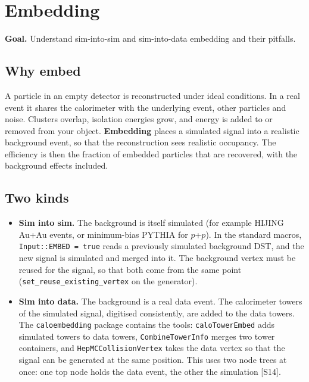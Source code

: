 \documentclass[11pt,letterpaper]{article}
\newcommand{\goal}[1]{\par\noindent\textbf{Goal.} #1\par}
\begin{document}
\section{Embedding}\label{sec:embed}
\goal{Understand sim-into-sim and sim-into-data embedding and their pitfalls.}

\subsection{Why embed}
A particle in an empty detector is reconstructed under ideal conditions. In a real event it shares the calorimeter with the underlying event, other particles and noise.
Clusters overlap, isolation energies grow, and energy is added to or removed from your object.
\textbf{Embedding} places a simulated signal into a realistic background event, so that the reconstruction sees realistic occupancy.
The efficiency is then the fraction of embedded particles that are recovered, with the background effects included.

\subsection{Two kinds}
\begin{itemize}
\item \textbf{Sim into sim.} The background is itself simulated (for example HIJING Au+Au events, or minimum-bias PYTHIA for $p$+$p$).
In the standard macros, \texttt{Input::EMBED = true} reads a previously simulated background DST, and the new signal is simulated and merged into it.
The background vertex must be reused for the signal, so that both come from the same point (\texttt{set\_reuse\_existing\_vertex} on the generator).
\item \textbf{Sim into data.} The background is a real data event. The calorimeter towers of the simulated signal, digitised consistently, are added to the data towers.
The \texttt{caloembedding} package contains the tools: \texttt{caloTowerEmbed} adds simulated towers to data towers, \texttt{CombineTowerInfo} merges two tower containers,
and \texttt{HepMCCollisionVertex} takes the data vertex so that the signal can be generated at the same position.
This uses two node trees at once: one top node holds the data event, the other the simulation [S14].
\end{itemize}
\end{document}
